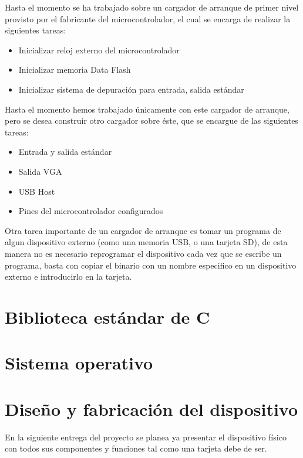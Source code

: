 Hasta el momento se ha trabajado sobre un cargador de arranque de primer nivel provisto por el fabricante del microcontrolador, el cual se encarga de realizar la siguientes tareas:

\begin{itemize}

\item Inicializar reloj externo del microcontrolador
\item Inicializar memoria Data Flash
\item Inicializar sistema de depuraci\'on para entrada, salida est\'andar

\end{itemize}

Hasta el momento hemos trabajado \'unicamente con este cargador de arranque, pero se desea construir otro cargador sobre \'este, que se encargue de las siguientes tareas:

\begin{itemize}

\item Entrada y salida est\'andar
\item Salida VGA
\item USB Host
\item Pines del microcontrolador configurados

\end{itemize}

Otra tarea importante de un cargador de arranque es tomar un programa de algun dispositivo externo (como una memoria USB, o una tarjeta SD), de esta manera no es necesario reprogramar el dispositivo cada vez que se escribe un programa, basta con copiar el binario con un nombre especifico en un dispositivo externo e introducirlo en la tarjeta.

\section{Biblioteca estándar de C}

\section{Sistema operativo}

\section{Dise\~no y fabricaci\'on del dispositivo}

En la siguiente entrega del proyecto se planea ya presentar el dispositivo f\'isico con todos sus componentes y funciones tal como una tarjeta debe de ser.\medskip

